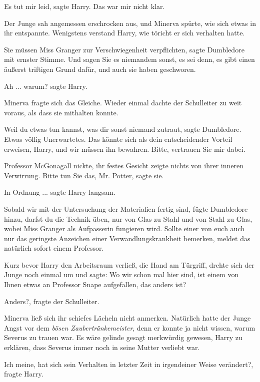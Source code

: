 \glqq{}Es tut mir leid\grqq{}, sagte Harry. \glqq{}Das war mir nicht
klar.\grqq{}

Der Junge sah angemessen erschrocken aus, und Minerva spürte, wie sich etwas in
ihr entspannte. Wenigstens verstand Harry, wie töricht er sich verhalten hatte.

\glqq{}Sie müssen Miss Granger zur Verschwiegenheit verpflichten\grqq{}, sagte
Dumbledore mit ernster Stimme. \glqq{}Und sagen Sie es niemandem sonst, es sei
denn, es gibt einen äußerst triftigen Grund dafür, und auch sie haben
geschworen.\grqq{}

\glqq{}Ah ... warum?\grqq{} sagte Harry.

Minerva fragte sich das Gleiche. Wieder einmal dachte der Schulleiter zu weit
voraus, als dass sie mithalten konnte.

\glqq{}Weil du etwas tun kannst, was dir sonst niemand zutraut\grqq{}, sagte
Dumbledore. \glqq{}Etwas völlig Unerwartetes. Das könnte sich als dein
entscheidender Vorteil erweisen, Harry, und wir müssen ihn bewahren. Bitte,
vertrauen Sie mir dabei.\grqq{}

Professor McGonagall nickte, ihr festes Gesicht zeigte nichts von ihrer inneren
Verwirrung. \glqq{}Bitte tun Sie das, Mr. Potter\grqq{}, sagte sie.

\glqq{}In Ordnung ...\grqq{} sagte Harry langsam.

\glqq{}Sobald wir mit der Untersuchung der Materialien fertig sind\grqq{}, fügte
Dumbledore hinzu, \glqq{}darfst du die Technik üben, nur von Glas zu Stahl und
von Stahl zu Glas, wobei Miss Granger als Aufpasserin fungieren wird. Sollte
einer von euch auch nur das geringste Anzeichen einer Verwandlungskrankheit
bemerken, meldet das natürlich sofort einem Professor.\grqq{}

Kurz bevor Harry den Arbeitsraum verließ, die Hand am Türgriff, drehte sich der
Junge noch einmal um und sagte: \glqq{}Wo wir schon mal hier sind, ist einem von
Ihnen etwas an Professor Snape aufgefallen, das anders ist?\grqq{}

\glqq{}Anders?\grqq{}, fragte der Schulleiter.

Minerva ließ sich ihr schiefes Lächeln nicht anmerken. Natürlich hatte der Junge
Angst vor dem \emph{ \glqq{}bösen Zaubertränkemeister\grqq{}}, denn er konnte ja
nicht wissen, warum Severus zu trauen war. Es wäre gelinde gesagt merkwürdig
gewesen, Harry zu erklären, dass Severus immer noch in seine Mutter verliebt
war.

\glqq{}Ich meine, hat sich sein Verhalten in letzter Zeit in irgendeiner Weise
verändert?\grqq{}, fragte Harry.

